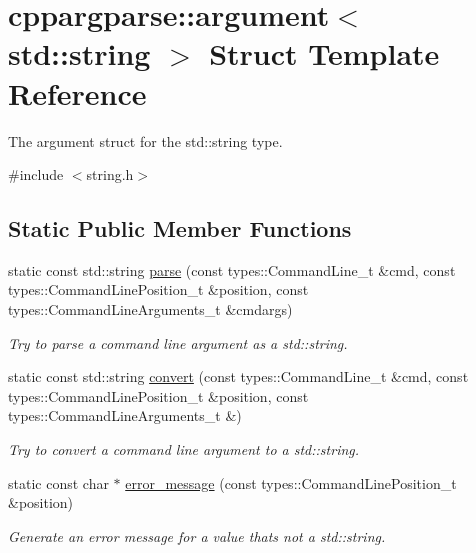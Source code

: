 \hypertarget{structcppargparse_1_1argument_3_01std_1_1string_01_4}{}\section{cppargparse\+:\+:argument$<$ std\+:\+:string $>$ Struct Template Reference}
\label{structcppargparse_1_1argument_3_01std_1_1string_01_4}


The argument struct for the std\+::string type.  




{\ttfamily \#include $<$string.\+h$>$}

\subsection*{Static Public Member Functions}
\begin{DoxyCompactItemize}
\item 
static const std\+::string \hyperlink{structcppargparse_1_1argument_3_01std_1_1string_01_4_af0b5a5adbfd58ee818f46f5d42f6f36d}{parse} (const types\+::\+Command\+Line\+\_\+t \&cmd, const types\+::\+Command\+Line\+Position\+\_\+t \&position, const types\+::\+Command\+Line\+Arguments\+\_\+t \&cmdargs)
\begin{DoxyCompactList}\small\item\em Try to parse a command line argument as a std\+::string. \end{DoxyCompactList}\item 
static const std\+::string \hyperlink{structcppargparse_1_1argument_3_01std_1_1string_01_4_aa54c1d7414d89a1071bb7cdb07be0b00}{convert} (const types\+::\+Command\+Line\+\_\+t \&cmd, const types\+::\+Command\+Line\+Position\+\_\+t \&position, const types\+::\+Command\+Line\+Arguments\+\_\+t \&)
\begin{DoxyCompactList}\small\item\em Try to convert a command line argument to a std\+::string. \end{DoxyCompactList}\item 
static const char $\ast$ \hyperlink{structcppargparse_1_1argument_3_01std_1_1string_01_4_abf0e56694e3cb65b632759217de194f1}{error\+\_\+message} (const types\+::\+Command\+Line\+Position\+\_\+t \&position)
\begin{DoxyCompactList}\small\item\em Generate an error message for a value that\textquotesingle{}s not a std\+::string. \end{DoxyCompactList}\end{DoxyCompactItemize}


